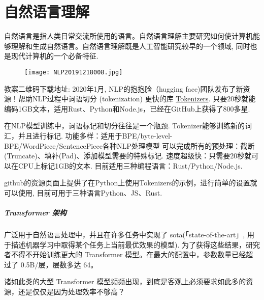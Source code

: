 \chapter{自然语言理解}\label{SSPChapter8}
\begin{tcolorbox}[colback=white!50,colframe=orange!50,title=自然语言]
\begin{center}
自然语言是指人类日常交流所使用的语言。自然语言理解主要研究如何使计算机能够理解和生成自然语言。自然语言理解既是人工智能研究较早的一个领域, 同时也是现代计算机的一个必备特征. \hfill
\end{center}
\end{tcolorbox}
\begin{figure}[H]
\centering
\texttt{[image: NLP20191218008.jpg]}
\end{figure}
教案二维码下载地址: 
2020年1月, NLP的抱抱脸（hugging face)团队发布了新资源！帮助NLP过程中词语切分 (tokenization) 更快的库 \href{https://github.com/huggingface/tokenizers}{Tokenizers}.
只要20秒就能编码1GB文本，适用Rust、Python和Node.js，已经在GitHub上获得了800多星.

在NLP模型训练中，词语标记和切分往往是一个瓶颈. Tokenizer能够训练新的词汇，并且进行标记.
功能多样：适用于BPE/byte-level-BPE/WordPiece/SentencePiece各种NLP处理模型
可以完成所有的预处理：截断(Truncate)、填补(Pad)、添加模型需要的特殊标记.
速度超级快：只需要20秒就可以在CPU上标记1GB的文本.
目前适用三种编程语言：Rust/Python/Node.js.

github的资源页面上提供了在Python上使用Tokenizers的示例，进行简单的设置就可以使用, 目前可用于三种语言Python、JS、Rust.
\paragraph{Transformer 架构}
广泛用于自然语言处理中，并且在许多任务中实现了 sota(「state-of-the-art」, 用于描述机器学习中取得某个任务上当前最优效果的模型). 
为了获得这些结果，研究者不得不开始训练更大的 Transformer 模型。在最大的配置中，参数数量已经超过了 0.5B/层，层数多达 64。

诸如此类的大型 Transformer 模型频频出现，到底是客观上必须要求如此多的资源，还是仅仅是因为处理效率不够高？


